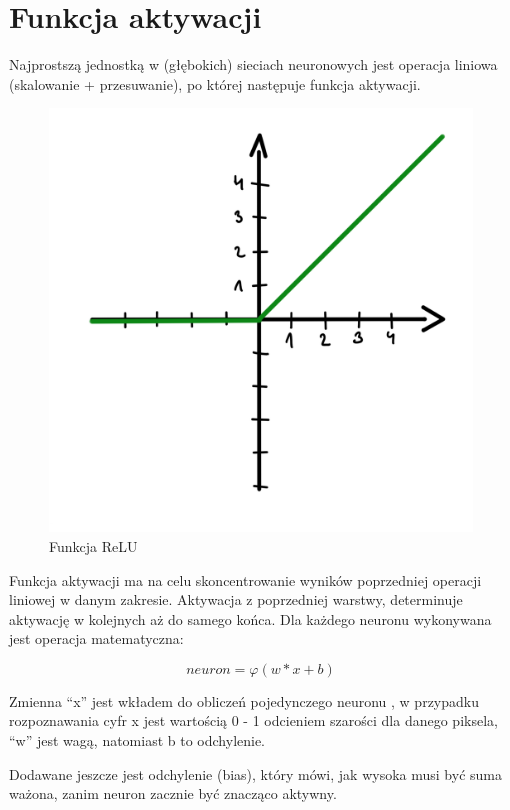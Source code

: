 \documentclass[brudnopis]{xmgr}
\begin{document}
\section{Funkcja aktywacji  \label{s:dsssl}}

Najprostszą jednostką w (głębokich) sieciach neuronowych jest operacja liniowa (skalowanie + przesuwanie), po której następuje funkcja aktywacji.

\begin{figure}[!tbh]
\centering
\includegraphics[width=.8\hsize]{fig/4}
\caption{Funkcja ReLU\label{RYS.3}}
\end{figure}

Funkcja aktywacji ma na celu skoncentrowanie wyników poprzedniej operacji liniowej w danym zakresie.
Aktywacja z poprzedniej warstwy, determinuje aktywację w kolejnych aż do samego końca. 
Dla każdego neuronu wykonywana jest operacja matematyczna:

\begin{equation}
neuron  = φ (w * x + b)
\end{equation}



 Zmienna “x” jest wkładem do obliczeń pojedynczego neuronu , w przypadku rozpoznawania cyfr x jest wartością 0 - 1 odcieniem szarości dla danego piksela, “w” jest wagą, natomiast b to odchylenie.
 
 
 Dodawane jeszcze jest odchylenie (bias), który mówi, jak wysoka musi być suma ważona, zanim neuron zacznie być znacząco aktywny.
\end{document}
